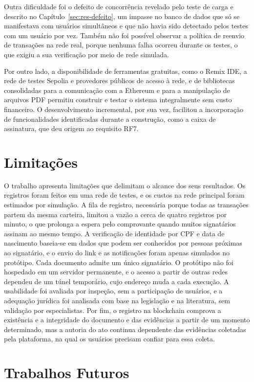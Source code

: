 \documentclass[
    12pt,
    a4paper,
    oneside,
    chapter=TITLE,
    section=TITLE,
    subsection=TITLE,
    subsubsection=TITLE,
    sumario=tradicional,
    english,
    brazil
]{abntex2}
\begin{document}
Outra dificuldade foi o defeito de concorrência revelado pelo teste de carga e descrito no Capítulo~\ref{sec:res-defeito}, um impasse no banco de dados que só se manifestava com usuários simultâneos e que não havia sido detectado pelos testes com um usuário por vez. Também não foi possível observar a política de reenvio de transações na rede real, porque nenhuma falha ocorreu durante os testes, o que exigiu a sua verificação por meio de rede simulada.

Por outro lado, a disponibilidade de ferramentas gratuitas, como o Remix IDE, a rede de testes Sepolia e provedores públicos de acesso à rede, e de bibliotecas consolidadas para a comunicação com a Ethereum e para a manipulação de arquivos PDF permitiu construir e testar o sistema integralmente sem custo financeiro. O desenvolvimento incremental, por sua vez, facilitou a incorporação de funcionalidades identificadas durante a construção, como a caixa de assinatura, que deu origem ao requisito RF7.

\section{Limitações}

O trabalho apresenta limitações que delimitam o alcance dos seus resultados. Os registros foram feitos em uma rede de testes, e os custos na rede principal foram estimados por simulação. A fila de registro, necessária porque todas as transações partem da mesma carteira, limitou a vazão a cerca de quatro registros por minuto, o que prolonga a espera pelo comprovante quando muitos signatários assinam ao mesmo tempo. A verificação de identidade por CPF e data de nascimento baseia-se em dados que podem ser conhecidos por pessoas próximas ao signatário, e o envio do link e as notificações foram apenas simulados no protótipo. Cada documento admite um único signatário. O protótipo não foi hospedado em um servidor permanente, e o acesso a partir de outras redes dependeu de um túnel temporário, cujo endereço muda a cada execução. A usabilidade foi avaliada por inspeção, sem a participação de usuários, e a adequação jurídica foi analisada com base na legislação e na literatura, sem validação por especialistas. Por fim, o registro na blockchain comprova a existência e a integridade do documento e das evidências a partir de um momento determinado, mas a autoria do ato continua dependente das evidências coletadas pela plataforma, na qual os usuários precisam confiar para essa coleta.

\section{Trabalhos Futuros}
\end{document}
